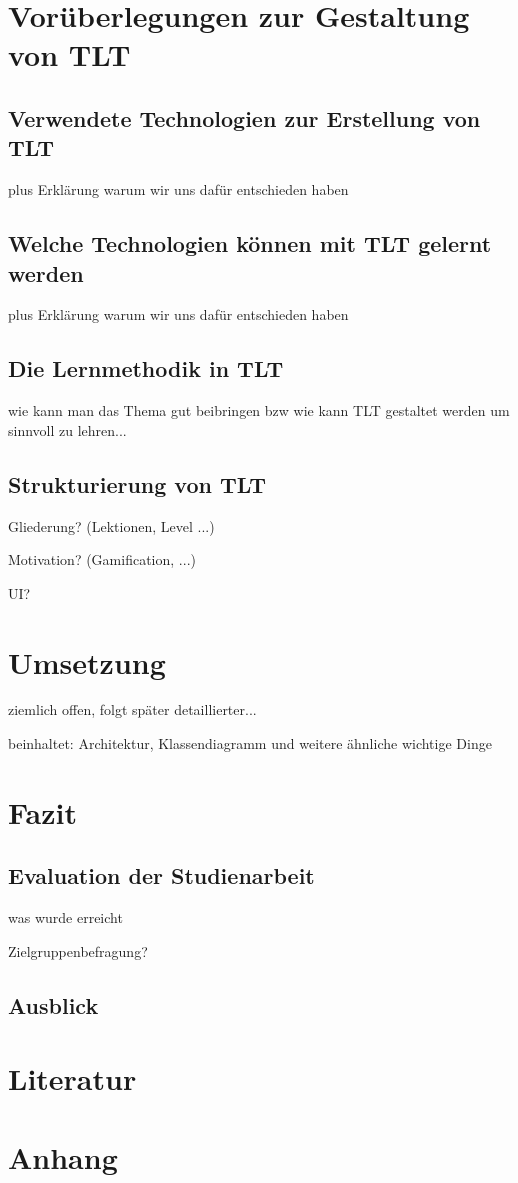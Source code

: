 \section{Vorüberlegungen zur Gestaltung von TLT}

\subsection{Verwendete Technologien zur Erstellung von TLT}

plus Erklärung warum wir uns dafür entschieden haben

\subsection{Welche Technologien können mit TLT gelernt werden}

plus Erklärung warum wir uns dafür entschieden haben

\subsection{Die Lernmethodik in TLT}

wie kann man das Thema gut beibringen bzw wie kann TLT gestaltet werden um sinnvoll zu lehren...

\subsection{Strukturierung von TLT}

Gliederung? (Lektionen, Level ...)

Motivation? (Gamification, ...)

UI?

\section{Umsetzung}

ziemlich offen, folgt später detaillierter...

beinhaltet: Architektur, Klassendiagramm und weitere ähnliche wichtige Dinge

\section{Fazit}

\subsection{Evaluation der Studienarbeit}

was wurde erreicht

Zielgruppenbefragung?

\subsection{Ausblick}

\section{Literatur}

\section{Anhang}